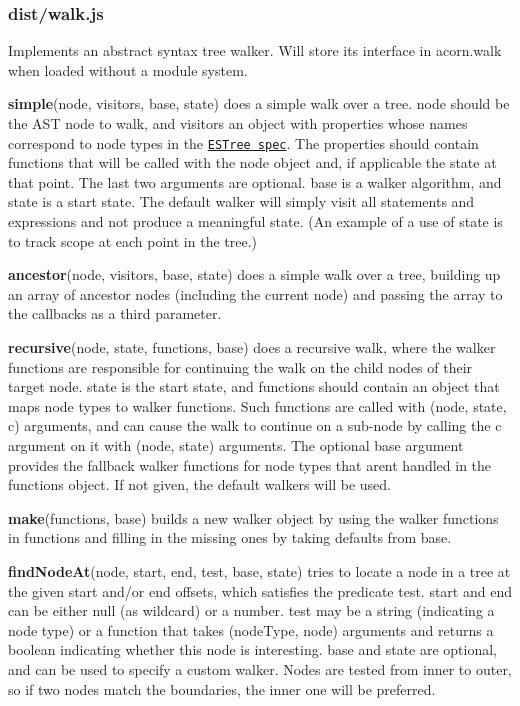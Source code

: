 \subsubsection*{dist/walk.\+js}

Implements an abstract syntax tree walker. Will store its interface in {\ttfamily acorn.\+walk} when loaded without a module system.

{\bfseries simple}{\ttfamily (node, visitors, base, state)} does a \textquotesingle{}simple\textquotesingle{} walk over a tree. {\ttfamily node} should be the A\+ST node to walk, and {\ttfamily visitors} an object with properties whose names correspond to node types in the \href{https://github.com/estree/estree}{\tt E\+S\+Tree spec}. The properties should contain functions that will be called with the node object and, if applicable the state at that point. The last two arguments are optional. {\ttfamily base} is a walker algorithm, and {\ttfamily state} is a start state. The default walker will simply visit all statements and expressions and not produce a meaningful state. (An example of a use of state is to track scope at each point in the tree.)

{\bfseries ancestor}{\ttfamily (node, visitors, base, state)} does a \textquotesingle{}simple\textquotesingle{} walk over a tree, building up an array of ancestor nodes (including the current node) and passing the array to the callbacks as a third parameter.

{\bfseries recursive}{\ttfamily (node, state, functions, base)} does a \textquotesingle{}recursive\textquotesingle{} walk, where the walker functions are responsible for continuing the walk on the child nodes of their target node. {\ttfamily state} is the start state, and {\ttfamily functions} should contain an object that maps node types to walker functions. Such functions are called with {\ttfamily (node, state, c)} arguments, and can cause the walk to continue on a sub-\/node by calling the {\ttfamily c} argument on it with {\ttfamily (node, state)} arguments. The optional {\ttfamily base} argument provides the fallback walker functions for node types that aren\textquotesingle{}t handled in the {\ttfamily functions} object. If not given, the default walkers will be used.

{\bfseries make}{\ttfamily (functions, base)} builds a new walker object by using the walker functions in {\ttfamily functions} and filling in the missing ones by taking defaults from {\ttfamily base}.

{\bfseries find\+Node\+At}{\ttfamily (node, start, end, test, base, state)} tries to locate a node in a tree at the given start and/or end offsets, which satisfies the predicate {\ttfamily test}. {\ttfamily start} and {\ttfamily end} can be either {\ttfamily null} (as wildcard) or a number. {\ttfamily test} may be a string (indicating a node type) or a function that takes {\ttfamily (node\+Type, node)} arguments and returns a boolean indicating whether this node is interesting. {\ttfamily base} and {\ttfamily state} are optional, and can be used to specify a custom walker. Nodes are tested from inner to outer, so if two nodes match the boundaries, the inner one will be preferred.

